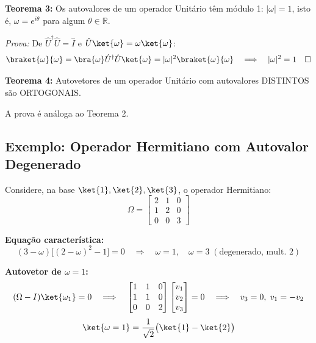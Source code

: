\begin{shadequote}
    \textbf{Teorema 3:} Os autovalores de um operador Unitário têm módulo 1: $|\omega| = 1$, isto é, $\omega = e^{i\theta}$ para algum $\theta \in \mathbb{R}$.
\end{shadequote}

\textit{Prova:} De $\hat{U}^\dagger\hat{U} = \hat{I}$ e $\hat{U}\ket{\omega} = \omega\ket{\omega}$:
\[
    \braket{\omega}{\omega} = \bra{\omega}\hat{U}^\dagger\hat{U}\ket{\omega} = |\omega|^2\braket{\omega}{\omega}
    \quad \Longrightarrow \quad |\omega|^2 = 1 \quad \square
\]

\begin{shadequote}
    \textbf{Teorema 4:} Autovetores de um operador Unitário com autovalores DISTINTOS são ORTOGONAIS.
\end{shadequote}

A prova é análoga ao Teorema 2.

\subsection*{Exemplo: Operador Hermitiano com Autovalor Degenerado}

Considere, na base $\ket{1}, \ket{2}, \ket{3}$, o operador Hermitiano:
\begin{equation}
    \Omega = \begin{bmatrix} 2 & 1 & 0 \\ 1 & 2 & 0 \\ 0 & 0 & 3 \end{bmatrix}
\end{equation}

\textbf{Equação característica:}
\begin{equation}
    (3-\omega)\bigl[(2-\omega)^2 - 1\bigr] = 0
    \quad \Longrightarrow \quad \omega = 1,\quad \omega = 3\; (\text{degenerado, mult.\ 2})
\end{equation}

\textbf{Autovetor de $\omega = 1$:}
\[
    (\Omega - I)\ket{\omega_1} = 0 \quad \Longrightarrow \quad
    \begin{bmatrix} 1 & 1 & 0 \\ 1 & 1 & 0 \\ 0 & 0 & 2 \end{bmatrix}
    \begin{bmatrix} v_1 \\ v_2 \\ v_3 \end{bmatrix} = 0
    \quad \Longrightarrow \quad v_3 = 0,\; v_1 = -v_2
\]
\begin{equation}
    \ket{\omega=1} = \frac{1}{\sqrt{2}}\bigl(\ket{1} - \ket{2}\bigr)
\end{equation}

